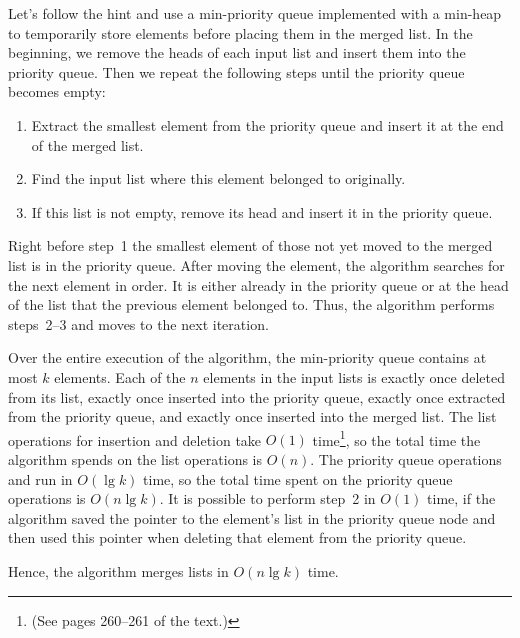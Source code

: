 Let's follow the hint and use a min-priority queue implemented with a min-heap to temporarily store elements before placing them in the merged list.
In the beginning, we remove the heads of each input list and insert them into the priority queue.
Then we repeat the following steps until the priority queue becomes empty:
\begin{enumerate}
    \item Extract the smallest element from the priority queue and insert it at the end of the merged list.
    \item Find the input list where this element belonged to originally.
    \item If this list is not empty, remove its head and insert it in the priority queue.
\end{enumerate}
Right before step~1 the smallest element of those not yet moved to the merged list is in the priority queue.
After moving the element, the algorithm searches for the next element in order.
It is either already in the priority queue or at the head of the list that the previous element belonged to.
Thus, the algorithm performs steps~2--3 and moves to the next iteration.

Over the entire execution of the algorithm, the min-priority queue contains at most $k$ elements.
Each of the $n$ elements in the input lists is exactly once deleted from its list, exactly once inserted into the priority queue, exactly once extracted from the priority queue, and exactly once inserted into the merged list.
The list operations for insertion and deletion take $O(1)$ time\footnote{(See pages 260--261 of the text.)}, so the total time the algorithm spends on the list operations is $O(n)$.
The priority queue operations  and  run in $O(\lg k)$ time, so the total time spent on the priority queue operations is $O(n\lg k)$.
It is possible to perform step~2 in $O(1)$ time, if the algorithm saved the pointer to the element's list in the priority queue node and then used this pointer when deleting that element from the priority queue.

Hence, the algorithm merges lists in $O(n\lg k)$ time.
